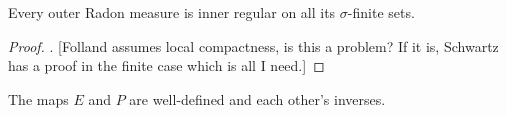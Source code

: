 \documentclass[article, a4paper, 11pt, oneside]{memoir}
\numberwithin{equation}{chapter}
\begin{document}
\begin{lemma}
    \label{thm:outer-Radon-inner-regular-on-finites}
    Every outer Radon measure is inner regular on all its $\sigma$-finite sets.
\end{lemma}

\begin{proof}
    \textcite[Proposition~7.5]{folland2007}. [Folland assumes local compactness, is this a problem? If it is, Schwartz has a proof in the finite case which is all I need.]
\end{proof}

\newcommand{\mylistlabelfont}[1]{{\normalfont\color{linkcolor}\textit{#1}:}}

\begin{theorem}
    The maps $E$ and $P$ are well-defined and each other's inverses.
\end{theorem}
\end{document}
